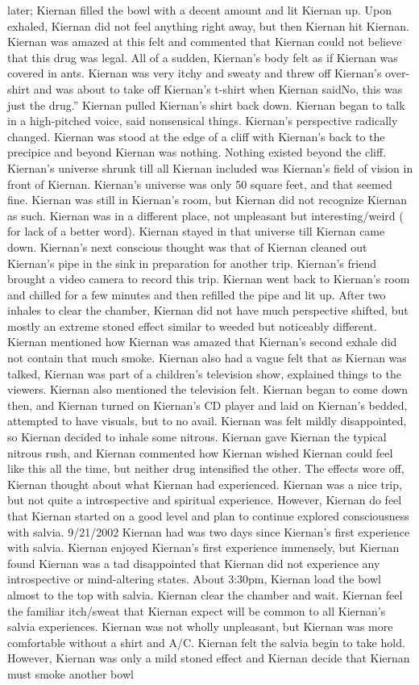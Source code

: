 \documentclass[12pt]{book}
\begin{document}
later; Kiernan filled the bowl with a decent amount and lit Kiernan up. Upon exhaled, Kiernan did not feel anything right away, but then Kiernan hit Kiernan. Kiernan was amazed at this felt and commented that Kiernan could not believe that this drug was legal. All of a sudden, Kiernan's body felt as if Kiernan was covered in ants. Kiernan was very itchy and sweaty and threw off Kiernan's over-shirt and was about to take off Kiernan's t-shirt when Kiernan saidNo, this was just the drug.'' Kiernan pulled Kiernan's shirt back down. Kiernan began to talk in a high-pitched voice, said nonsensical things. Kiernan's perspective radically changed. Kiernan was stood at the edge of a cliff with Kiernan's back to the precipice and beyond Kiernan was nothing. Nothing existed beyond the cliff. Kiernan's universe shrunk till all Kiernan included was Kiernan's field of vision in front of Kiernan. Kiernan's universe was only 50 square feet, and that seemed fine. Kiernan was still in Kiernan's room, but Kiernan did not recognize Kiernan as such. Kiernan was in a different place, not unpleasant but interesting/weird ( for lack of a better word). Kiernan stayed in that universe till Kiernan came down. Kiernan's next conscious thought was that of Kiernan cleaned out Kiernan's pipe in the sink in preparation for another trip. Kiernan's friend brought a video camera to record this trip. Kiernan went back to Kiernan's room and chilled for a few minutes and then refilled the pipe and lit up. After two inhales to clear the chamber, Kiernan did not have much perspective shifted, but mostly an extreme stoned effect similar to weeded but noticeably different. Kiernan mentioned how Kiernan was amazed that Kiernan's second exhale did not contain that much smoke. Kiernan also had a vague felt that as Kiernan was talked, Kiernan was part of a children's television show, explained things to the viewers. Kiernan also mentioned the television felt. Kiernan began to come down then, and Kiernan turned on Kiernan's CD player and laid on Kiernan's bedded, attempted to have visuals, but to no avail. Kiernan was felt mildly disappointed, so Kiernan decided to inhale some nitrous. Kiernan gave Kiernan the typical nitrous rush, and Kiernan commented how Kiernan wished Kiernan could feel like this all the time, but neither drug intensified the other. The effects wore off, Kiernan thought about what Kiernan had experienced. Kiernan was a nice trip, but not quite a introspective and spiritual experience. However, Kiernan do feel that Kiernan started on a good level and plan to continue explored consciousness with salvia. 9/21/2002 Kiernan had was two days since Kiernan's first experience with salvia. Kiernan enjoyed Kiernan's first experience immensely, but Kiernan found Kiernan was a tad disappointed that Kiernan did not experience any introspective or mind-altering states. About 3:30pm, Kiernan load the bowl almost to the top with salvia. Kiernan clear the chamber and wait. Kiernan feel the familiar itch/sweat that Kiernan expect will be common to all Kiernan's salvia experiences. Kiernan was not wholly unpleasant, but Kiernan was more comfortable without a shirt and A/C. Kiernan felt the salvia begin to take hold. However, Kiernan was only a mild stoned effect and Kiernan decide that Kiernan must smoke another bowl 
\end{document}
